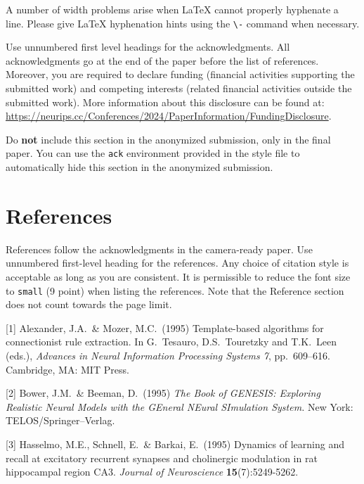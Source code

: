 \documentclass{article}
\begin{document}
A number of width problems arise when \LaTeX{} cannot properly hyphenate a
line. Please give LaTeX hyphenation hints using the \verb+\-+ command when
necessary.

\begin{ack}
  Use unnumbered first level headings for the acknowledgments. All acknowledgments
  go at the end of the paper before the list of references. Moreover, you are required to declare
  funding (financial activities supporting the submitted work) and competing interests (related financial activities outside the submitted work).
  More information about this disclosure can be found at: \url{https://neurips.cc/Conferences/2024/PaperInformation/FundingDisclosure}.


  Do {\bf not} include this section in the anonymized submission, only in the final paper. You can use the \texttt{ack} environment provided in the style file to automatically hide this section in the anonymized submission.
\end{ack}

\section*{References}


References follow the acknowledgments in the camera-ready paper. Use unnumbered first-level heading for
the references. Any choice of citation style is acceptable as long as you are
consistent. It is permissible to reduce the font size to \verb+small+ (9 point)
when listing the references.
Note that the Reference section does not count towards the page limit.
\medskip


{
\small


[1] Alexander, J.A.\ \& Mozer, M.C.\ (1995) Template-based algorithms for
connectionist rule extraction. In G.\ Tesauro, D.S.\ Touretzky and T.K.\ Leen
(eds.), {\it Advances in Neural Information Processing Systems 7},
pp.\ 609--616. Cambridge, MA: MIT Press.


  [2] Bower, J.M.\ \& Beeman, D.\ (1995) {\it The Book of GENESIS: Exploring
    Realistic Neural Models with the GEneral NEural SImulation System.}  New York:
TELOS/Springer--Verlag.


[3] Hasselmo, M.E., Schnell, E.\ \& Barkai, E.\ (1995) Dynamics of learning and
recall at excitatory recurrent synapses and cholinergic modulation in rat
hippocampal region CA3. {\it Journal of Neuroscience} {\bf 15}(7):5249-5262.
}


\end{document}
